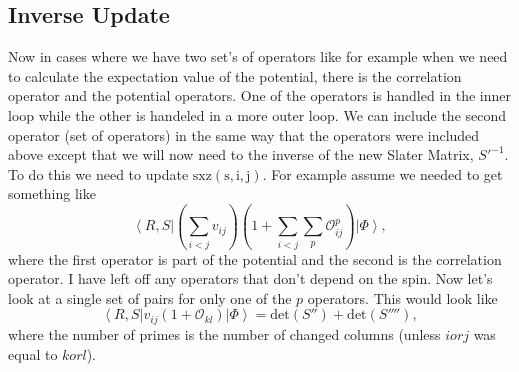 \documentclass[12pt]{extarticle}
\newcommand{\Okl}{\mathcal{O}_{kl}}
\newcommand{\Oijp}{\mathcal{O}^p_{ij}}
\newcommand{\ket}[1]{\left| #1 \right>}
\newcommand{\bra}[1]{\left< #1 \right|}
\begin{document}
\subsection{Inverse Update}
Now in cases where we have two set's of operators like for example when we need to calculate the expectation value of the potential, there is the correlation operator and the potential operators. One of the operators is handled in the inner loop while the other is handeled in a more outer loop. We can include the second operator (set of operators) in the same way that the operators were included above except that we will now need to the inverse of the new Slater Matrix, $S'^{-1}$. To do this we need to update $\mathrm{sxz(s,i,j)}$. For example assume we needed to get something like
\begin{equation}
  \bra{R,S}(\sum_{i<j}v_{ij})(1+\sum_{i<j}\sum_p \Oijp) \ket{\Phi},
\end{equation}
where the first operator is part of the potential and the second is the correlation operator. I have left off any operators that don't depend on the spin. Now let's look at a single set of pairs for only one of the $p$ operators. This would look like
\begin{equation}
  \bra{R,S} v_{ij}(1+\Okl) \ket{\Phi} = \mathrm{det}(S'') + \mathrm{det}(S''''),
\end{equation}
where the number of primes is the number of changed columns (unless $i or j$ was equal to $k or l$).



\end{document}
